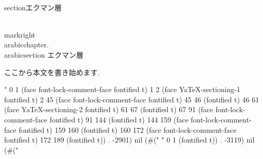 {\\section{エクマン層}      %

\\markright{\\arabic{chapter}.\\arabic{section}
エクマン層} %


ここから本文を書き始めます.

" 0 1 (face font-lock-comment-face fontified t) 1 2 (face YaTeX-sectioning-1 fontified t) 2 45 (face font-lock-comment-face fontified t) 45 46 (fontified t) 46 61 (face YaTeX-sectioning-2 fontified t) 61 67 (fontified t) 67 91 (face font-lock-comment-face fontified t) 91 144 (fontified t) 144 159 (face font-lock-comment-face fontified t) 159 160 (fontified t) 160 172 (face font-lock-comment-face fontified t) 172 189 (fontified t)) . -2901) nil (#("
" 0 1 (fontified t)) . -3119) nil (#("%






%
%
%
%
%
%
%
%
%

}
